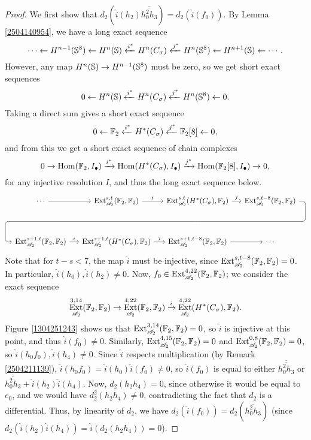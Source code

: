 \documentclass[11pt, titlepage]{article} %
\def\bb{\ensuremath\mathbb}
\def\A{\ensuremath{\mathscr{A}_2}}
\DeclareMathOperator{\Ext}{Ext}
\DeclareMathOperator{\Hom}{Hom}
\numberwithin{equation}{subsection}
\theoremstyle{plain}
\theoremstyle{definition}
\begin{document}
\begin{proof}
We first show that \(d_2(\hat i(h_2) \overline{\overline{h_0^2h_3}})=d_2(\hat i(f_0))\). By Lemma \ref{2504140954}, we have a long exact sequence
\[\cdots \leftarrow H^{n-1}(\bb{S}^8) \leftarrow H^n(\bb{S}) \xleftarrow{i^*} H^n(C_\sigma) \xleftarrow{j^*} H^n(\bb{S}^8)\leftarrow H^{n+1}(\bb{S}) \leftarrow \cdots.\]
However, any map \(H^n(\bb{S})\to H^{n-1}(\bb{S}^8)\) must be zero, so we get short exact sequences 
\[0 \leftarrow H^n(\bb{S})\xleftarrow{i^*} H^n(C_\sigma) \xleftarrow{j^*} H^n(\bb{S}^8)\leftarrow 0.\]
Taking a direct sum gives a short exact sequence
\[0 \leftarrow \bb{F}_2 \xleftarrow{i^*} H^*(C_\sigma) \xleftarrow{j^*} \bb{F}_2[8] \leftarrow 0,\]
and from this we get a short exact sequence of chain complexes
\[0 \to \Hom(\bb{F}_2, I_\bullet) \xrightarrow{i^*} \Hom(H^*(C_\sigma), I_\bullet) \xrightarrow{j^*} \Hom(\bb{F}_2[8], I_\bullet)\to 0,\]
for any injective resolution \(I\), and thus the long exact sequence below.
\[\begin{tikzcd}[row sep=8ex, column sep=3ex]
\cdots \arrow[r, ""] & \Ext_{\A}^{s,t}(\bb{F}_2, \bb{F}_2) \arrow[r, "i"] & \Ext_{\A}^{s,t}(H^*(C_\sigma), \bb{F}_2) \arrow[r, "j"] \ar[draw=none]{d}[name=X, anchor=center]{} & \Ext_{\A}^{s,t-8}(\bb{F}_2, \bb{F}_2) \ar[rounded corners, to path={ -- ([xshift=2ex]\tikztostart.east) |- (X.center) \tikztonodes -| ([xshift=-2ex]\tikztotarget.west) -- (\tikztotarget)}]{dlll}[at end]{} \\
\Ext_{\A}^{s+1,t}(\bb{F}_2, \bb{F}_2) \arrow[r, "i"] & \Ext_{\A}^{s+1,t}(H^*(C_\sigma), \bb{F}_2) \arrow[r, "j"] & \Ext_{\A}^{s+1,t-8}(\bb{F}_2, \bb{F}_2) \arrow[r, ""] & \cdots
\end{tikzcd}\]
Note that for \(t-s<7\), the map \(\hat i\) must be injective, since \(\Ext_{\A}^{s,t-8}(\bb{F}_2, \bb{F}_2)=0\). In particular, \(\hat i(h_0), \hat i(h_2)\neq 0\). 
Now, \(f_0\in \Ext_{\A}^{4,22}(\bb{F}_2, \bb{F}_2)\); we consider the exact sequence
\[\Ext_{\A}^{3,14}(\bb{F}_2, \bb{F}_2)\to \Ext_{\A}^{4,22}(\bb{F}_2, \bb{F}_2) \xrightarrow{i} \Ext_{\A}^{4,22}(H^*(C_\sigma), \bb{F}_2).\]
Figure \ref{1304251243} shows us that \(\Ext_{\A}^{3,14}(\bb{F}_2, \bb{F}_2)=0\), so \(\hat i\) is injective at this point, and thus \(\hat i(f_0)\neq 0\). Similarly, \(\Ext_{\A}^{4,15}(\bb{F}_2, \bb{F}_2)=0\) and \(\Ext_{\A}^{0,8}(\bb{F}_2, \bb{F}_2)=0\), so \(\hat i(h_0f_0), \hat i(h_4)\neq 0\). Since \(\hat i\) respects multiplication (by Remark \ref{2504211139}), \(\hat i(h_0f_0)=\hat i(h_0)\hat i(f_0)\neq 0\), so \(\hat i(f_0)\) is equal to either \(\overline{\overline{h_0^2h_3}}\) or \(\overline{\overline{h_0^2h_3}}+\hat i(h_2)\hat{i}(h_4)\). Now, \(d_2(h_2h_4)=0\), since otherwise it would be equal to \(e_0\), and we would have \(d_2^2(h_2h_4)\neq 0\), contradicting the fact that \(d_2\) is a differential. Thus, by linearity of \(d_2\), we have \(d_2(\hat i(f_0))=d_2(\overline{\overline{h_0^2h_3}})\) (since \(d_2(\hat i (h_2)\hat i (h_4))=\hat i(d_2(h_2h_4))=0\)).


\end{proof}
\end{document}
